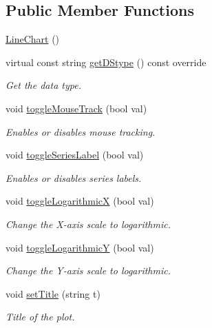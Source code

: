 \subsection*{Public Member Functions}
\begin{DoxyCompactItemize}
\item 
\hyperlink{classbridges_1_1datastructure_1_1_line_chart_ab96c0639aca0d08c19e5d3b51a29b0a6}{Line\+Chart} ()
\item 
virtual const string \hyperlink{classbridges_1_1datastructure_1_1_line_chart_a431e49c31cdd5f46e978742776306dfa}{get\+D\+Stype} () const override
\begin{DoxyCompactList}\small\item\em Get the data type. \end{DoxyCompactList}\item 
void \hyperlink{classbridges_1_1datastructure_1_1_line_chart_aece56ea5afaf10037b698673801c4496}{toggle\+Mouse\+Track} (bool val)
\begin{DoxyCompactList}\small\item\em Enables or disables mouse tracking. \end{DoxyCompactList}\item 
void \hyperlink{classbridges_1_1datastructure_1_1_line_chart_a21031cd026426ab91307626ce9651c03}{toggle\+Series\+Label} (bool val)
\begin{DoxyCompactList}\small\item\em Enables or disables series labels. \end{DoxyCompactList}\item 
void \hyperlink{classbridges_1_1datastructure_1_1_line_chart_a4e2aa224d793793faa0c5a6edb729646}{toggle\+LogarithmicX} (bool val)
\begin{DoxyCompactList}\small\item\em Change the X-\/axis scale to logarithmic. \end{DoxyCompactList}\item 
void \hyperlink{classbridges_1_1datastructure_1_1_line_chart_a30c72748323d3da25974b30e11e46f48}{toggle\+LogarithmicY} (bool val)
\begin{DoxyCompactList}\small\item\em Change the Y-\/axis scale to logarithmic. \end{DoxyCompactList}\item 
void \hyperlink{classbridges_1_1datastructure_1_1_line_chart_ac42cf1e6348ce8ab0c3593a496a3539c}{set\+Title} (string t)
\begin{DoxyCompactList}\small\item\em Title of the plot. \end{DoxyCompactList}\item 

\end{DoxyCompactItemize}
